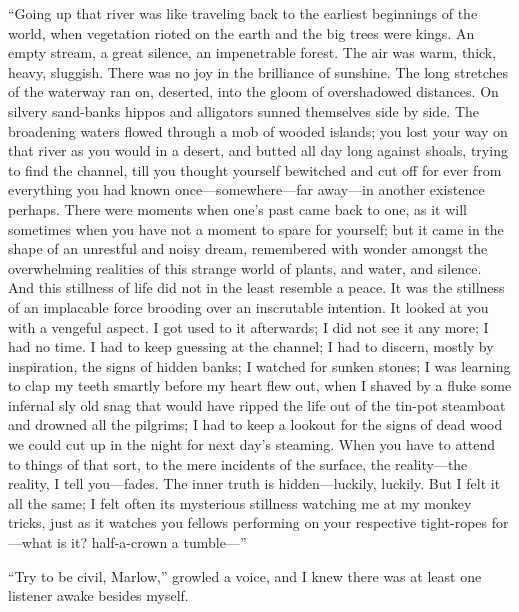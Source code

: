 \documentclass[12pt]{report}
\begin{document}
``Going up that river was like traveling back to the earliest beginnings
of the world, when vegetation rioted on the earth and the big trees were
kings. An empty stream, a great silence, an impenetrable forest. The air
was warm, thick, heavy, sluggish. There was no joy in the brilliance of
sunshine. The long stretches of the waterway ran on, deserted, into the
gloom of overshadowed distances. On silvery sand-banks hippos and
alligators sunned themselves side by side. The broadening waters flowed
through a mob of wooded islands; you lost your way on that river as you
would in a desert, and butted all day long against shoals, trying to
find the channel, till you thought yourself bewitched and cut off for
ever from everything you had known once---somewhere---far away---in
another existence perhaps. There were moments when one's past came back
to one, as it will sometimes when you have not a moment to spare for
yourself; but it came in the shape of an unrestful and noisy dream,
remembered with wonder amongst the overwhelming realities of this
strange world of plants, and water, and silence. And this stillness of
life did not in the least resemble a peace. It was the stillness of an
implacable force brooding over an inscrutable intention. It looked at
you with a vengeful aspect. I got used to it afterwards; I did not see
it any more; I had no time. I had to keep guessing at the channel; I had
to discern, mostly by inspiration, the signs of hidden banks; I watched
for sunken stones; I was learning to clap my teeth smartly before my
heart flew out, when I shaved by a fluke some infernal sly old snag that
would have ripped the life out of the tin-pot steamboat and drowned all
the pilgrims; I had to keep a lookout for the signs of dead wood we
could cut up in the night for next day's steaming. When you have to
attend to things of that sort, to the mere incidents of the surface, the
reality---the reality, I tell you---fades. The inner truth is
hidden---luckily, luckily. But I felt it all the same; I felt often its
mysterious stillness watching me at my monkey tricks, just as it watches
you fellows performing on your respective tight-ropes for---what is it?
half-a-crown a tumble---''

``Try to be civil, Marlow,'' growled a voice, and I knew there was at
least one listener awake besides myself.
\end{document}

